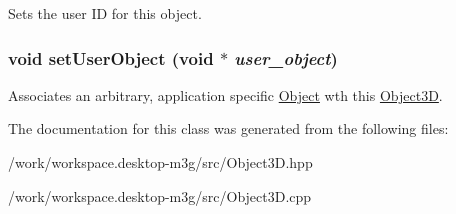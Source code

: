 Sets the user ID for this object. \hypertarget{classm3g_1_1Object3D_2285b0af7d6d293c4cf0e0d4559fd9b5}{
\subsubsection[{setUserObject}]{\setlength{\rightskip}{0pt plus 5cm}void setUserObject (void $\ast$ {\em user\_\-object})}}
\label{classm3g_1_1Object3D_2285b0af7d6d293c4cf0e0d4559fd9b5}


Associates an arbitrary, application specific \hyperlink{classm3g_1_1Object}{Object} wth this \hyperlink{classm3g_1_1Object3D}{Object3D}. 

The documentation for this class was generated from the following files:\begin{CompactItemize}
\item 
/work/workspace.desktop-m3g/src/Object3D.hpp\item 
/work/workspace.desktop-m3g/src/Object3D.cpp\end{CompactItemize}
